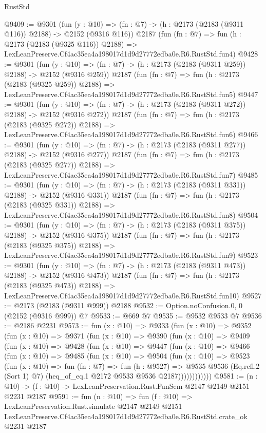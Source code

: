 \begin{lexlean}{RustStd}
\begin{coremodule}
@9409 := @9301
    (fun (y : @10) => (fn : @7) -> (h : @2173 (@2183 (@9311 @116)) @2188) -> @2152 (@9316 @116))
    @2187
    (fun (fn : @7) =>
    fun (h : @2173 (@2183 (@9325 @116)) @2188) =>
    LexLeanPreserve.Cf4ac35ea4a198017d1d9d27772edba0e.R6.RustStd.fun4)
@9428 := @9301
    (fun (y : @10) => (fn : @7) -> (h : @2173 (@2183 (@9311 @259)) @2188) -> @2152 (@9316 @259))
    @2187
    (fun (fn : @7) =>
    fun (h : @2173 (@2183 (@9325 @259)) @2188) =>
    LexLeanPreserve.Cf4ac35ea4a198017d1d9d27772edba0e.R6.RustStd.fun5)
@9447 := @9301
    (fun (y : @10) => (fn : @7) -> (h : @2173 (@2183 (@9311 @272)) @2188) -> @2152 (@9316 @272))
    @2187
    (fun (fn : @7) =>
    fun (h : @2173 (@2183 (@9325 @272)) @2188) =>
    LexLeanPreserve.Cf4ac35ea4a198017d1d9d27772edba0e.R6.RustStd.fun6)
@9466 := @9301
    (fun (y : @10) => (fn : @7) -> (h : @2173 (@2183 (@9311 @277)) @2188) -> @2152 (@9316 @277))
    @2187
    (fun (fn : @7) =>
    fun (h : @2173 (@2183 (@9325 @277)) @2188) =>
    LexLeanPreserve.Cf4ac35ea4a198017d1d9d27772edba0e.R6.RustStd.fun7)
@9485 := @9301
    (fun (y : @10) => (fn : @7) -> (h : @2173 (@2183 (@9311 @331)) @2188) -> @2152 (@9316 @331))
    @2187
    (fun (fn : @7) =>
    fun (h : @2173 (@2183 (@9325 @331)) @2188) =>
    LexLeanPreserve.Cf4ac35ea4a198017d1d9d27772edba0e.R6.RustStd.fun8)
@9504 := @9301
    (fun (y : @10) => (fn : @7) -> (h : @2173 (@2183 (@9311 @375)) @2188) -> @2152 (@9316 @375))
    @2187
    (fun (fn : @7) =>
    fun (h : @2173 (@2183 (@9325 @375)) @2188) =>
    LexLeanPreserve.Cf4ac35ea4a198017d1d9d27772edba0e.R6.RustStd.fun9)
@9523 := @9301
    (fun (y : @10) => (fn : @7) -> (h : @2173 (@2183 (@9311 @473)) @2188) -> @2152 (@9316 @473))
    @2187
    (fun (fn : @7) =>
    fun (h : @2173 (@2183 (@9325 @473)) @2188) =>
    LexLeanPreserve.Cf4ac35ea4a198017d1d9d27772edba0e.R6.RustStd.fun10)
@9527 := @2173 (@2183 (@9311 @999)) @2188
@9532 := Option.noConfusion.{0, 0} (@2152 (@9316 @999)) @7
@9533 := @669 @7
@9535 := @9532 @9533 @7
@9536 := @2186 @2231
@9573 := fun (x : @10) =>
  @9333
    (fun (x : @10) =>
    @9352
      (fun (x : @10) =>
      @9371
        (fun (x : @10) =>
        @9390
          (fun (x : @10) =>
          @9409
            (fun (x : @10) =>
            @9428
              (fun (x : @10) =>
              @9447
                (fun (x : @10) =>
                @9466
                  (fun (x : @10) =>
                  @9485
                    (fun (x : @10) =>
                    @9504
                      (fun (x : @10) =>
                      @9523
                        (fun (x : @10) =>
                        fun (fn : @7) =>
                        fun (h : @9527) =>
                        @9535
                          @9536
                          (Eq.refl.{2} (Sort 1) @7)
                          (heq_of_eq.{1} @2172 @9533 @9536 @2187))))))))))))
@9581 := (n : @10) -> (f : @10) -> LexLeanPreservation.Rust.FunSem @2147 @2149 @2151 @2231 @2187
@9591 := fun (n : @10) =>
  fun (f : @10) =>
  LexLeanPreservation.Rust.simulate
    @2147
    @2149
    @2151
    LexLeanPreserve.Cf4ac35ea4a198017d1d9d27772edba0e.R6.RustStd.crate_ok
    @2231
    @2187
\end{coremodule}
\end{lexlean}
